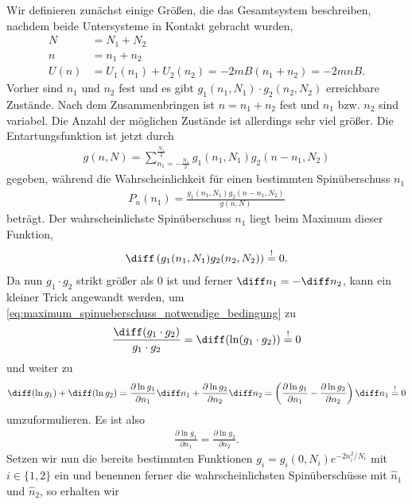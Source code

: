 Wir definieren zunächst einige Größen, die das Gesamtsystem beschreiben, nachdem beide Untersysteme in Kontakt gebracht wurden,
\begin{align*}
    N    & = N_1+N_2                                 \\
    n    & = n_1+n_2                                 \\
    U(n) & =U_1(n_1)+U_2(n_2) = -2mB(n_1+n_2)=-2mnB.
\end{align*}
Vorher sind $n_1$ und $n_2$ fest und es gibt $g_1(n_1,N_1)\cdot g_2(n_2,N_2)$ erreichbare Zustände. Nach dem Zusammenbringen ist $n=n_1+n_2$ fest und $n_1$ bzw. $n_2$ sind variabel. Die Anzahl der möglichen Zustände ist allerdings sehr viel größer. Die Entartungsfunktion ist jetzt durch
\begin{align*}
    g(n,N) = \sum_{n_1=-\frac{N_1}{2}}^{\frac{N_1}{2}} g_1(n_1,N_1)g_2(n-n_1,N_2)
\end{align*}
gegeben, während die Wahrscheinlichkeit für einen bestimmten Spinüberschuss $n_1$
\begin{align*}
    P_n(n_1) = \frac{g_1(n_1,N_1)g_2(n-n_1,N_2)}{g(n,N)}
\end{align*}
beträgt. Der wahrscheinlichste Spinüberschuss $n_1$ liegt beim Maximum dieser Funktion,
\begin{align}
    \label{eq:maximum_spinueberschuss_notwendige_bedingung}
    \diff \left(g_1(n_1,N_1)g_2(n_2,N_2)\right) \overset{!}{=} 0. 
\end{align}
Da nun $g_1\cdot g_2$ strikt größer als $0$ ist und ferner $\diff n_1=-\diff n_2$, kann ein kleiner Trick angewandt werden, um \eqref{eq:maximum_spinueberschuss_notwendige_bedingung} zu 
\begin{align*}
    \frac{\diff(g_1\cdot g_2)}{g_1\cdot g_2}=\diff(\ln(g_1\cdot g_2)) \overset{!}{=} 0
\end{align*}
und weiter zu 
\begin{align*}
    \diff(\ln g_1) + \diff(\ln g_2) = \frac{\partial \ln g_1}{\partial n_1} \diff n_1 + \frac{\partial \ln g_2}{\partial n_2} \diff n_2 = \left(\frac{\partial \ln g_1}{\partial n_1} - \frac{\partial \ln g_2}{\partial n_2}\right) \diff n_1  \overset{!}{=} 0
\end{align*}
umzuformulieren. Es ist also 
\begin{align}
    \label{eq:bedingung_wahrscheinlichster_spinueberschuss}
    \boxed{\frac{\partial \ln g_1}{\partial n_1}  = \frac{\partial \ln g_2}{\partial n_2} .}
\end{align}
Setzen wir nun die bereits bestimmten Funktionen $g_i=g_i(0,N_i) e^{-2n_i^2/N_i}$ mit $i\in\{1,2\}$ ein und benennen ferner die wahrscheinlichsten Spinüberschüsse mit $\hat{n}_1$ und $\hat{n}_2$, so erhalten wir 
